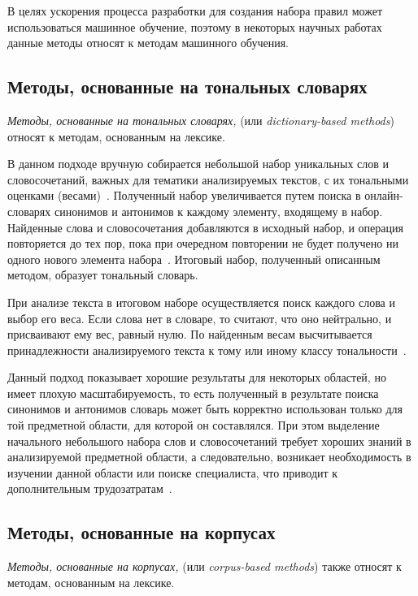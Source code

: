 В целях ускорения процесса разработки для создания набора правил может
использоваться машинное обучение, поэтому в некоторых научных работах
\cite{article16}~\cite{article17} данные методы относят к методам машинного
обучения.

\subsection{Методы, основанные на тональных словарях}

\textit{Методы, основанные на тональных словарях,} (или \textit{dictionary-based
methods}) относят к методам, основанным на лексике.

В данном подходе вручную собирается небольшой набор уникальных слов и
словосочетаний, важных для тематики анализируемых текстов, с их тональными
оценками (весами)~\cite{article9}. Полученный набор увеличивается путем поиска в
онлайн-словарях синонимов и антонимов к каждому элементу, входящему в набор.
Найденные слова и словосочетания добавляются в исходный набор, и операция
повторяется до тех пор, пока при очередном повторении не будет получено ни
одного нового элемента набора~\cite{article4}. Итоговый набор, полученный
описанным методом, образует тональный словарь.

При анализе текста в итоговом наборе осуществляется поиск каждого слова и выбор
его веса. Если слова нет в словаре, то считают, что оно нейтрально, и
присваивают ему вес, равный нулю. По найденным весам высчитывается
принадлежности анализируемого текста к тому или иному классу
тональности~\cite{article9}.

Данный подход показывает хорошие результаты для некоторых областей, но
имеет плохую масштабируемость, то есть полученный в результате поиска
синонимов и антонимов словарь может быть корректно использован только для
той предметной области, для которой он составлялся. При этом выделение
начального небольшого набора слов и словосочетаний требует хороших
знаний в анализируемой предметной области, а следовательно, возникает
необходимость в изучении данной области или поиске специалиста, что приводит к
дополнительным трудозатратам~\cite{article9}.


\subsection{Методы, основанные на корпусах}

\textit{Методы, основанные на корпусах,} (или \textit{corpus-based
methods}) также относят к методам, основанным на лексике.

